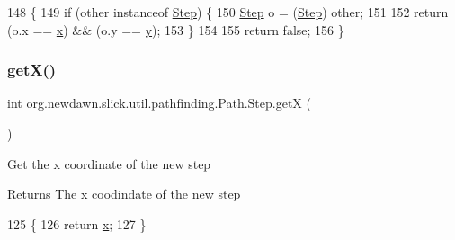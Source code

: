 \begin{DoxyCode}
148                                             \{
149             \textcolor{keywordflow}{if} (other instanceof \mbox{\hyperlink{classorg_1_1newdawn_1_1slick_1_1util_1_1pathfinding_1_1_path_1_1_step_ab0228967bede7207738a1e95a9cdc183}{Step}}) \{
150                 \mbox{\hyperlink{classorg_1_1newdawn_1_1slick_1_1util_1_1pathfinding_1_1_path_1_1_step_ab0228967bede7207738a1e95a9cdc183}{Step}} o = (\mbox{\hyperlink{classorg_1_1newdawn_1_1slick_1_1util_1_1pathfinding_1_1_path_1_1_step_ab0228967bede7207738a1e95a9cdc183}{Step}}) other;
151                 
152                 \textcolor{keywordflow}{return} (o.x == \mbox{\hyperlink{classorg_1_1newdawn_1_1slick_1_1util_1_1pathfinding_1_1_path_1_1_step_a6764404c2d713db22efbeb2ec33cbdc1}{x}}) && (o.y == \mbox{\hyperlink{classorg_1_1newdawn_1_1slick_1_1util_1_1pathfinding_1_1_path_1_1_step_ae77364516b69d2b5ed5ed550413c05e9}{y}});
153             \}
154             
155             \textcolor{keywordflow}{return} \textcolor{keyword}{false};
156         \}
\end{DoxyCode}
\mbox{\label{classorg_1_1newdawn_1_1slick_1_1util_1_1pathfinding_1_1_path_1_1_step_a1a51a84b0a5acd6bc49de69d67f87356}} 
\subsubsection{\texorpdfstring{get\+X()}{getX()}}
{\footnotesize\ttfamily int org.\+newdawn.\+slick.\+util.\+pathfinding.\+Path.\+Step.\+getX (\begin{DoxyParamCaption}{ }\end{DoxyParamCaption})\hspace{0.3cm}{\ttfamily [inline]}}

Get the x coordinate of the new step

\begin{DoxyReturn}{Returns}
The x coodindate of the new step 
\end{DoxyReturn}

\begin{DoxyCode}
125                           \{
126             \textcolor{keywordflow}{return} \mbox{\hyperlink{classorg_1_1newdawn_1_1slick_1_1util_1_1pathfinding_1_1_path_1_1_step_a6764404c2d713db22efbeb2ec33cbdc1}{x}};
127         \}
\end{DoxyCode}
\mbox{\label{classorg_1_1newdawn_1_1slick_1_1util_1_1pathfinding_1_1_path_1_1_step_af44029ddf6437f4f8cd2627f71492d2d}} 
